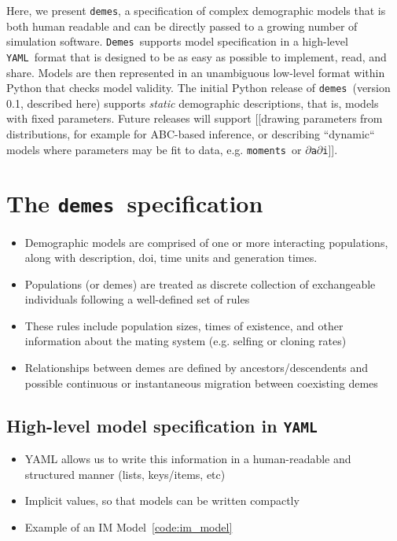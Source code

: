 \documentclass[11pt]{article}
\newcommand{\demes}[0]{\texttt{demes}}
\newcommand{\Demes}[0]{\texttt{Demes}}
\newcommand{\YAML}[0]{\texttt{YAML}}
\newcommand{\moments}[0]{\texttt{moments}}
\newcommand{\dadi}[0]{\texttt{$\partial$a$\partial$i}}
\begin{document}
Here, we present \demes, a specification of complex demographic models that is
both human readable and can be directly passed to a growing number of
simulation software. \Demes\ supports model specification in a high-level
\YAML\ format \citep{ben2009yaml} that is designed to be as easy as possible to
implement, read, and share. Models are then represented in an unambiguous
low-level format within Python that checks model validity. The initial Python
release of \demes\ (version 0.1, described here) supports \emph{static}
demographic descriptions, that is, models with fixed parameters. Future
releases will support [[drawing parameters from distributions, for example for
ABC-based inference, or describing ``dynamic`` models where parameters may be
fit to data, e.g. \moments\ or \dadi]].

\section*{The \demes\ specification}

\begin{itemize}
    \item Demographic models are comprised of one or more interacting
        populations, along with description, doi, time units and generation
        times.
    \item Populations (or demes) are treated as discrete collection of
        exchangeable individuals following a well-defined set of rules
    \item These rules include population sizes, times of existence, and other
        information about the mating system (e.g. selfing or cloning rates)
    \item Relationships between demes are defined by ancestors/descendents
        and possible continuous or instantaneous migration between coexisting
        demes
\end{itemize}

\subsection*{High-level model specification in \YAML}

\begin{itemize}
    \item YAML allows us to write this information in a human-readable and
        structured manner (lists, keys/items, etc)
    \item Implicit values, so that models can be written compactly
    \item Example of an IM Model~\ref{code:im_model}
\end{itemize}
\end{document}
